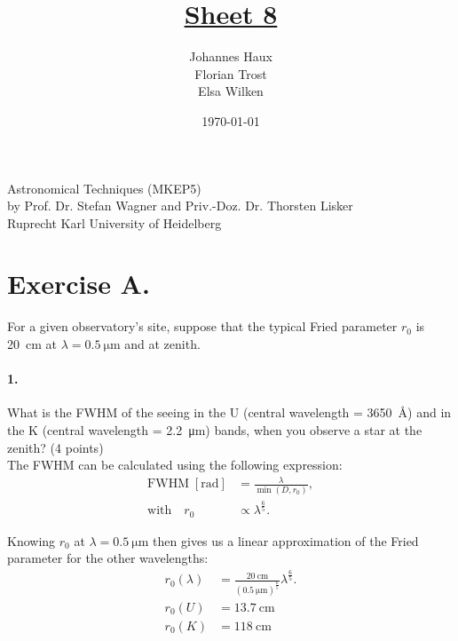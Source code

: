 \documentclass[11pt,a4paper,twoside]{article}
\title{\LARGE \underline {Sheet 8}}
\author{Johannes Haux \\ Florian Trost \\ Elsa Wilken}
\date{\today}
\newcommand{\op}[1]{\operatorname{#1}}
\begin{document}
\maketitle
\thispagestyle{empty}

\begin{center}
  Astronomical Techniques (MKEP5) \\
  \baselineskip35pt
  by Prof. Dr. Stefan Wagner and Priv.-Doz. Dr. Thorsten Lisker \\
  \baselineskip60pt
  Ruprecht Karl University of Heidelberg
\vskip 40pt

\end{center}

\newpage
\setcounter{page}{1}		%

\section*{Exercise A.}
For a given observatory's site, suppose that the typical Fried parameter $r_0$
is \SI{20}{\centi\meter} at $\lambda = \SI{0.5}{\micro\meter}$ and at zenith.  

\paragraph{1.} What is the FWHM of the seeing in the U (central wavelength =
\SI{3650}{\angstrom}) and in the K (central wavelength =
\SI{2.2}{\micro\meter}) bands, when you observe a star at the zenith? (4
points) \\

The FWHM can be calculated using the following expression:
\begin{align}
\mathrm{FWHM} \;[\si{\radian}] &= \frac{\lambda}{\op{min}\left(D, r_0 \right)}, \label{eq:S0} \\
\text{with} \quad r_0 &\propto \lambda^{\frac{6}{5}}.
\end{align}

Knowing $r_0$ at $\lambda = \SI{0.5}{\micro\meter}$ then gives us a linear 
approximation of the Fried parameter for the other wavelengths:
\begin{align}
r_0(\lambda) &= \frac{\SI{20}{\centi\meter}}
                     {\left(\SI{0.5}{\micro\meter}\right)^{\frac{6}{5}}}
                \lambda^{\frac{6}{5}}. \label{eq:r0} \\ 
r_0(U) &= \SI{13.7}{\centi\meter}   \\
r_0(K) &= \SI{118}{\centi\meter}
\end{align}
\end{document}
